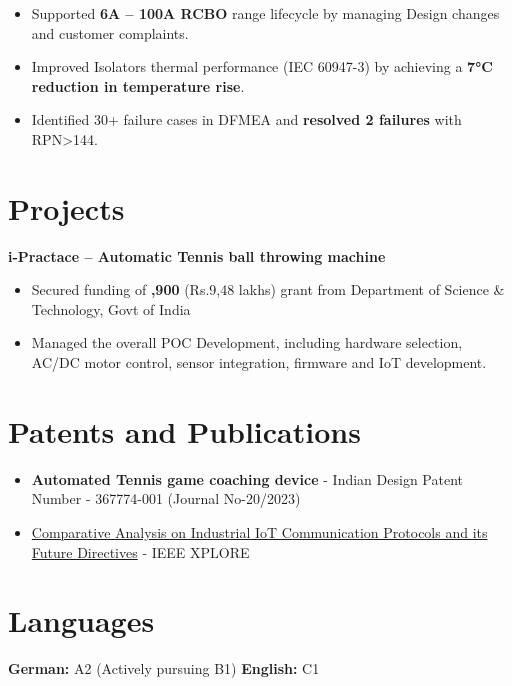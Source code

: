 \documentclass[letterpaper,11pt]{article}
\begin{document}
\begin{itemize}[leftmargin=*]
    \item Supported \textbf{6A -- 100A RCBO} range lifecycle by managing Design changes and customer complaints.
    \item Improved Isolators thermal performance (IEC 60947-3) by achieving a \textbf{7°C reduction in temperature rise}.
    \item Identified 30+ failure cases in DFMEA and \textbf{resolved 2 failures} with RPN>144.
  \end{itemize}

\section{Projects}
\textbf{i-Practace \textbf{--} Automatic Tennis ball throwing machine}
\begin{itemize}[leftmargin=*]
    \item Secured funding of \textbf{,900} (Rs.9,48 lakhs) grant from Department of Science \& Technology, Govt of India
    \item Managed the overall POC Development, including hardware selection, AC/DC motor control, sensor integration, firmware and IoT development.
\end{itemize}

\section{Patents and Publications}
\textbf{}
\begin{itemize}[leftmargin=*]
    \item \textbf{Automated Tennis game coaching device} - \small Indian Design Patent Number - 367774-001 (Journal No-20/2023)
    \item \href{https://ieeexplore.ieee.org/document/9675583} {Comparative Analysis on Industrial IoT Communication Protocols and its Future Directives} - IEEE XPLORE
\end{itemize}

\section{Languages}
  \vspace{2pt}
  \textbf{German:} {A2 (Actively pursuing B1)} 
  \quad
  \textbf{English:} {C1}
\end{document}

